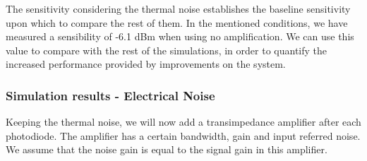 The sensitivity considering the thermal noise establishes the baseline 
sensitivity upon which to compare the rest of them. In the mentioned 
conditions, we have measured a sensibility of -6.1 dBm when using no 
amplification. We can use this value to compare with the rest of the 
simulations, in order to quantify the increased performance provided by 
improvements on the system.



\subsubsection{Simulation results - Electrical Noise}\label{sec:simRes_eNoise}

Keeping the thermal noise, we will now add a transimpedance amplifier after 
each photodiode. The amplifier has a certain bandwidth, gain and input referred 
noise. We assume that the noise gain is equal to the signal gain in this 
amplifier.

